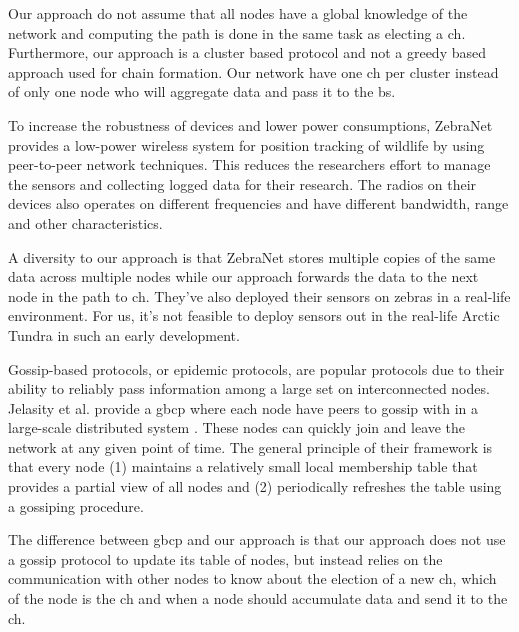 \documentclass[USenglish]{uit-thesis}
\begin{document}
Our approach do not assume that all nodes have a global knowledge of the network and computing the path is done in the same task as electing a \gls{ch}. Furthermore, our approach is a cluster based protocol and not a greedy based approach used for chain formation. Our network have one \gls{ch} per cluster instead of only one node who will aggregate data and pass it to the \gls{bs}.


To increase the robustness of devices and lower power consumptions, ZebraNet \cite{zebranet} provides a low-power wireless system for position tracking of wildlife by using peer-to-peer network techniques. This reduces the researchers effort to manage the sensors and collecting logged data for their research. The radios on their devices also operates on different frequencies and have different bandwidth, range and other characteristics.

A diversity to our approach is that ZebraNet stores multiple copies of the same data across multiple nodes while our approach forwards the data to the next node in the path to \gls{ch}. They've also deployed their sensors on zebras in a real-life environment. For us, it's not feasible to deploy sensors out in the real-life Arctic Tundra in such an early development.


Gossip-based protocols, or epidemic protocols, are popular protocols due to their ability to reliably pass information among a large set on interconnected nodes. Jelasity et al. \cite{gbsampling} provide a \gls{gbcp} where each node have peers to gossip with in a large-scale distributed system \cite{demers}. These nodes can quickly join and leave the network at any given point of time. The general principle of their framework is that every node (1) maintains a relatively small local membership table that provides a partial view of all nodes and (2) periodically refreshes the table using a gossiping procedure.

The difference between \gls{gbcp} and our approach is that our approach does not use a gossip protocol to update its table of nodes, but instead relies on the communication with other nodes to know about the election of a new \gls{ch}, which of the node is the \gls{ch} and when a node should accumulate data and send it to the \gls{ch}.


\end{document}
